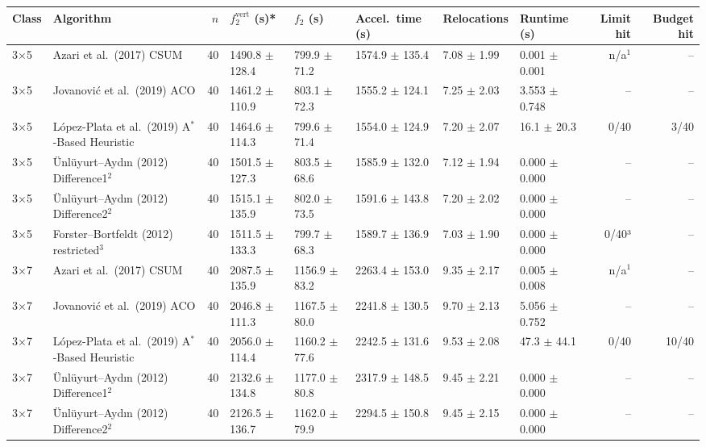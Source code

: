 \begin{table}[htbp]
\centering
\small
\begin{tabular}{llrlllllrr}
\toprule
Class & Algorithm & $n$ & $f_2^{\mathrm{vert}}$ (s)* & $f_2$ (s) & Accel.\ time (s) & Relocations & Runtime (s) & Limit hit & Budget hit \\
\midrule
3$\times$5 & Azari et al.\ (2017) CSUM & 40 & 1490.8 $\pm$ 128.4 & 799.9 $\pm$ 71.2 & 1574.9 $\pm$ 135.4 & 7.08 $\pm$ 1.99 & 0.001 $\pm$ 0.001 & n/a$^{1}$ & -- \\
3$\times$5 & Jovanovi\'{c} et al.\ (2019) ACO & 40 & 1461.2 $\pm$ 110.9 & 803.1 $\pm$ 72.3 & 1555.2 $\pm$ 124.1 & 7.25 $\pm$ 2.03 & 3.553 $\pm$ 0.748 & -- & -- \\
3$\times$5 & L\'{o}pez-Plata et al.\ (2019) A$^\ast$-Based Heuristic & 40 & 1464.6 $\pm$ 114.3 & 799.6 $\pm$ 71.4 & 1554.0 $\pm$ 124.9 & 7.20 $\pm$ 2.07 & 16.1 $\pm$ 20.3 & 0/40 & 3/40 \\
3$\times$5 & \"{U}nl\"{u}yurt--Ayd\i{}n (2012) Difference1$^{2}$ & 40 & 1501.5 $\pm$ 127.3 & 803.5 $\pm$ 68.6 & 1585.9 $\pm$ 132.0 & 7.12 $\pm$ 1.94 & 0.000 $\pm$ 0.000 & -- & -- \\
3$\times$5 & \"{U}nl\"{u}yurt--Ayd\i{}n (2012) Difference2$^{2}$ & 40 & 1515.1 $\pm$ 135.9 & 802.0 $\pm$ 73.5 & 1591.6 $\pm$ 143.8 & 7.20 $\pm$ 2.02 & 0.000 $\pm$ 0.000 & -- & -- \\
3$\times$5 & Forster--Bortfeldt (2012) restricted$^{3}$ & 40 & 1511.5 $\pm$ 133.3 & 799.7 $\pm$ 68.3 & 1589.7 $\pm$ 136.9 & 7.03 $\pm$ 1.90 & 0.000 $\pm$ 0.000 & 0/40³ & -- \\
\midrule
3$\times$7 & Azari et al.\ (2017) CSUM & 40 & 2087.5 $\pm$ 135.9 & 1156.9 $\pm$ 83.2 & 2263.4 $\pm$ 153.0 & 9.35 $\pm$ 2.17 & 0.005 $\pm$ 0.008 & n/a$^{1}$ & -- \\
3$\times$7 & Jovanovi\'{c} et al.\ (2019) ACO & 40 & 2046.8 $\pm$ 111.3 & 1167.5 $\pm$ 80.0 & 2241.8 $\pm$ 130.5 & 9.70 $\pm$ 2.13 & 5.056 $\pm$ 0.752 & -- & -- \\
3$\times$7 & L\'{o}pez-Plata et al.\ (2019) A$^\ast$-Based Heuristic & 40 & 2056.0 $\pm$ 114.4 & 1160.2 $\pm$ 77.6 & 2242.5 $\pm$ 131.6 & 9.53 $\pm$ 2.08 & 47.3 $\pm$ 44.1 & 0/40 & 10/40 \\
3$\times$7 & \"{U}nl\"{u}yurt--Ayd\i{}n (2012) Difference1$^{2}$ & 40 & 2132.6 $\pm$ 134.8 & 1177.0 $\pm$ 80.8 & 2317.9 $\pm$ 148.5 & 9.45 $\pm$ 2.21 & 0.000 $\pm$ 0.000 & -- & -- \\
3$\times$7 & \"{U}nl\"{u}yurt--Ayd\i{}n (2012) Difference2$^{2}$ & 40 & 2126.5 $\pm$ 136.7 & 1162.0 $\pm$ 79.9 & 2294.5 $\pm$ 150.8 & 9.45 $\pm$ 2.15 & 0.000 $\pm$ 0.000 & -- & -- \\

\end{tabular}
\end{table}
